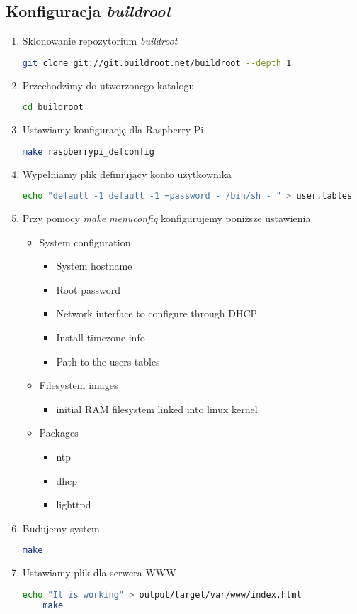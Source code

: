 \subsection{Konfiguracja \emph{buildroot}}
\begin{enumerate}
	\item Sklonowanie repozytorium \emph{buildroot}
	\begin{lstlisting}[language=bash]
	git clone git://git.buildroot.net/buildroot --depth 1
	\end{lstlisting}
	\item Przechodzimy do utworzonego katalogu
	\begin{lstlisting}[language=bash]
	cd buildroot
	\end{lstlisting}	
	\item Ustawiamy konfigurację dla Raspberry Pi
	\begin{lstlisting}[language=bash]
	make raspberrypi_defconfig
	\end{lstlisting}	
	\item Wypełniamy plik definiujący konto użytkownika
	\begin{lstlisting}[language=bash]
	echo "default -1 default -1 =password - /bin/sh - " > user.tables
	\end{lstlisting}		
	\item Przy pomocy \emph{make menuconfig}
	konfigurujemy poniższe ustawienia\\
	\begin{itemize}	
		\item System configuration
		\begin{itemize}
			\item System hostname
			\item Root password
			\item Network interface to configure through DHCP
			\item Install timezone info
			\item Path to the users tables
		\end{itemize}
		\item Filesystem images
		\begin{itemize}
			\item initial RAM filesystem linked into linux kernel
		\end{itemize}
		\item Packages 
		\begin{itemize}
			\item ntp
			\item dhcp
			\item lighttpd
		\end{itemize}
	\end{itemize}
	\item Budujemy system
	\begin{lstlisting}[language=bash]
	make
	\end{lstlisting}	
	\item Ustawiamy plik dla serwera WWW
	\begin{lstlisting}[language=bash]
	echo "It is working" > output/target/var/www/index.html
	make 
	\end{lstlisting}	
\end{enumerate}

